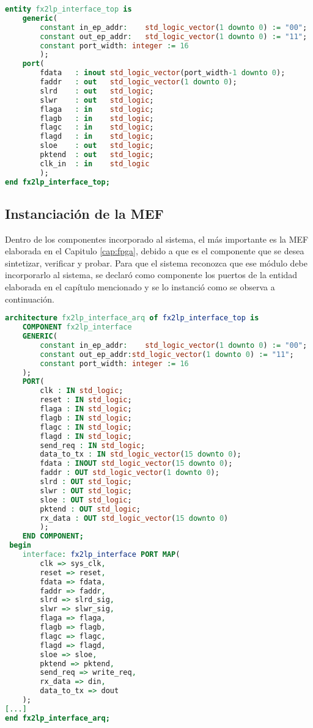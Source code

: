 	\begin{lstlisting}[language=VHDL,backgroundcolor=\color{gray!30}]
entity fx2lp_interface_top is
	generic(
		constant in_ep_addr:	std_logic_vector(1 downto 0) := "00";
		constant out_ep_addr:	std_logic_vector(1 downto 0) := "11";
		constant port_width: integer := 16
		);
	port(
		fdata   : inout std_logic_vector(port_width-1 downto 0);  
		faddr   : out   std_logic_vector(1 downto 0);
		slrd    : out   std_logic;
		slwr    : out   std_logic;
		flaga   : in    std_logic;
		flagb   : in    std_logic;
		flagc   : in    std_logic;
		flagd   : in    std_logic;
		sloe    : out   std_logic;
		pktend  : out   std_logic;
		clk_in  : in    std_logic
		);
end fx2lp_interface_top;
	\end{lstlisting}

\subsection{Instanciación de la MEF}
		Dentro de los componentes incorporado al sistema, el más importante es la MEF elaborada en el Capitulo \ref{cap:fpga}, debido a que es el componente que se desea sintetizar, verificar y probar. Para que el sistema reconozca que ese módulo debe incorporarlo al sistema, se declaró como componente los puertos de la entidad elaborada en el capítulo mencionado y se lo instanció como se observa a continuación.
		
		\begin{lstlisting}[language=VHDL,backgroundcolor=\color{gray!30}]
 architecture fx2lp_interface_arq of fx2lp_interface_top is
 	COMPONENT fx2lp_interface
	GENERIC(
		constant in_ep_addr:	std_logic_vector(1 downto 0) := "00";
		constant out_ep_addr:std_logic_vector(1 downto 0) := "11";
		constant port_width: integer := 16
	);
	PORT(
		clk : IN std_logic;
		reset : IN std_logic;
		flaga : IN std_logic;
		flagb : IN std_logic;
		flagc : IN std_logic;
		flagd : IN std_logic;
		send_req : IN std_logic;
		data_to_tx : IN std_logic_vector(15 downto 0);    
		fdata : INOUT std_logic_vector(15 downto 0);      
		faddr : OUT std_logic_vector(1 downto 0);
		slrd : OUT std_logic;
		slwr : OUT std_logic;
		sloe : OUT std_logic;
		pktend : OUT std_logic;
		rx_data : OUT std_logic_vector(15 downto 0)
		);
	END COMPONENT;
 begin
 	interface: fx2lp_interface PORT MAP(
		clk => sys_clk,
		reset => reset,
		fdata => fdata,
		faddr => faddr,
		slrd => slrd_sig,
		slwr => slwr_sig,
		flaga => flaga,
		flagb => flagb,
		flagc => flagc,
		flagd => flagd,
		sloe => sloe,
		pktend => pktend,
		send_req => write_req,
		rx_data => din,
		data_to_tx => dout
	);
[...]
end fx2lp_interface_arq;
		\end{lstlisting}
		
